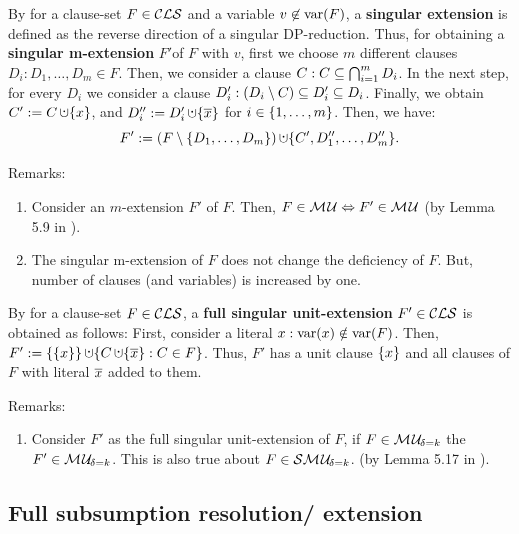 \documentclass{report}
\begin{document}
\begin{defi}\label{def:singularextn}
By \cite{KullmannZhao2010Extremal} for a clause-set $F \in\mathcal{CLS}$ and a variable $v \not \in \operatorname{var}(F)$, a \textbf{singular extension} is defined as the reverse direction of a singular DP-reduction. Thus, for obtaining a \textbf{singular m-extension} $F' $of $F$ with $v$, first we choose $m$ different clauses $D_i:D_1, \dots, D_m \in F$. Then, we consider a clause  $C: C \subseteq \bigcap_{i=1}^m D_i$. In the next step, for every $D_i$ we consider a clause $D_i':(D_i \setminus C) \subseteq D_i' \subseteq D_i$. Finally, we obtain $C' := C \addcup \set{x}$, and $D_i'' := D_i' \addcup \set{\ol{x}}$ for $i \in \{ 1, \dots, m \}$. Then, we have:
  \begin{displaymath}
    F' := (F \sm \set{D_1,\dots,D_m}) \addcup \set{C', D_1'',\dots,D_m''}.
  \end{displaymath}
\end{defi}
Remarks:
  \begin{enumerate}
  \item Consider an $m$-extension $F'$ of $F$. Then, $F \in \mathcal{M\hspace{0.8pt}U} \Leftrightarrow F' \in \mathcal{M\hspace{0.8pt}U}$ (by Lemma 5.9 in \cite{KullmannZhao2010Extremal}).
  \item The singular m-extension of $F$ does not change the deficiency of $F$. But, number of clauses (and variables) is increased by one.
  \end{enumerate}
  
\begin{defi}\label{def:unit-ext}
By \cite{KullmannZhao2010Extremal} for a clause-set $F \in \mathcal{CLS}$, a \textbf{full singular unit-extension} $F' \in \mathcal{CLS}$ is obtained as follows: First, consider a literal $x:\operatorname{var}(x) \notin \operatorname{var}(F)$. Then, $F' := \set{\set{x}} \addcup \set{C \addcup \set{\ol{x}} : C \in F}$. Thus, $F' $ has a unit clause $\{ x \}$ and all clauses of $F$ with literal $\overline{x}$ added to them.
\end{defi}
Remarks:
  \begin{enumerate}
  \item Consider $F'$ as the full singular unit-extension of $F$, if $F \in \mathcal{M\hspace{0.8pt}U}_{\!\delta=k} $ the  $F' \in \mathcal{M\hspace{0.8pt}U}_{\!\delta=k} $. This is also true about $F \in \mathcal{S}\mathcal{M\hspace{0.8pt}U}_{\!\delta=k}$. (by Lemma 5.17 in \cite{KullmannZhao2010Extremal}).
  \end{enumerate}
\subsection{Full subsumption resolution/ extension}
\label{sec:fsr-e}  
\end{document}
